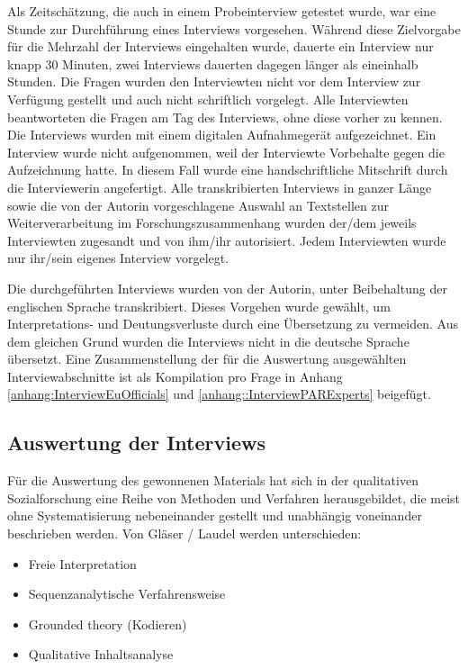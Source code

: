 Als Zeitschätzung, die auch in einem Probeinterview getestet wurde, war eine Stunde zur Durchführung eines Interviews vorgesehen. Während diese Zielvorgabe für die Mehrzahl der Interviews eingehalten wurde, dauerte ein Interview nur knapp 30 Minuten, zwei Interviews dauerten dagegen länger als eineinhalb Stunden. Die Fragen wurden den Interviewten nicht vor dem Interview zur Verfügung gestellt und auch nicht schriftlich vorgelegt. Alle Interviewten beantworteten die Fragen am Tag des Interviews, ohne diese vorher zu kennen. Die Interviews wurden mit einem digitalen Aufnahmegerät aufgezeichnet. Ein Interview wurde nicht aufgenommen, weil der Interviewte Vorbehalte gegen die Aufzeichnung hatte. In diesem Fall wurde eine handschriftliche Mitschrift durch die Interviewerin angefertigt. Alle transkribierten Interviews in ganzer Länge sowie die von der Autorin vorgeschlagene Auswahl an Textstellen zur Weiterverarbeitung im Forschungszusammenhang wurden der/dem jeweils Interviewten zugesandt und von ihm/ihr autorisiert. Jedem Interviewten wurde nur ihr/sein eigenes Interview vorgelegt.\par
Die durchgeführten Interviews wurden von der Autorin, unter Beibehaltung der englischen Sprache transkribiert. Dieses Vorgehen wurde gewählt, um Interpretations- und Deutungsverluste durch eine Übersetzung zu vermeiden. Aus dem gleichen Grund wurden die Interviews nicht in die deutsche Sprache übersetzt. Eine Zusammenstellung der für die Auswertung ausgewählten Interviewabschnitte ist als Kompilation pro Frage in Anhang \ref{anhang:InterviewEuOfficials} und \ref{anhang::InterviewPARExperts} beigefügt.

\subsection{Auswertung der Interviews}
Für die Auswertung des gewonnenen Materials hat sich in der qualitativen Sozialforschung eine Reihe von Methoden und Verfahren herausgebildet, die meist ohne Systematisierung nebeneinander gestellt und unabhängig voneinander beschrieben werden. Von Gläser / Laudel werden unterschieden:
\begin{itemize}
\item Freie Interpretation
\item Sequenzanalytische Verfahrensweise
\item Grounded theory (Kodieren)
\item Qualitative Inhaltsanalyse
\end{itemize}

